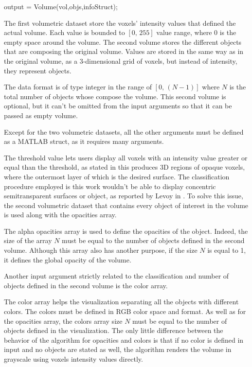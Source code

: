 \documentclass[12pt,a4paper]{extarticle}
\newcommand{\linespace}{\vspace{0pt}}
\begin{document}
\begin{cpp}[caption={Volume rendering MEX function call with left and right arguments, respectively output and input arguments},label=code:volumecall]
output = Volume(vol,objs,infoStruct);
\end{cpp}

The first volumetric dataset store the voxels' intensity values that defined the actual volume. Each value is bounded to $[0,\,255]$ value range, where $0$ is the empty space around the volume. The second volume stores the different objects that are composing the original volume. Values are stored in the same way as in the original volume, as a 3-dimensional grid of voxels, but instead of intensity, they represent objects. 

The data format is of type integer in the range of $[0,\,(N-1)]$ where $N$ is the total number of objects whose compose the volume. This second volume is optional, but it can't be omitted from the input arguments so that it can be passed as empty volume.

Except for the two volumetric datasets, all the other arguments must be defined as a MATLAB struct, as it requires many arguments.
\linespace

The threshold value lets users display all voxels with an intensity value greater or equal than the threshold, as stated in \cite{levoy_1988:4} this produces 3D regions of opaque voxels, where the outermost layer of which is the desired surface.
The classification procedure employed is this work wouldn't be able to display concentric semitransparent surfaces or object, as reported by Levoy in \cite{levoy_1988:4}. To solve this issue, the second volumetric dataset that contains every object of interest in the volume is used along with the opacities array.
\linespace

The alpha opacities array is used to define the opacities of the object. Indeed, the size of the array $N$ must be equal to the number of objects defined in the second volume. 
Although this array also has another purpose, if the size $N$ is equal to 1, it defines the global opacity of the volume.

Another input argument strictly related to the classification and number of objects defined in the second volume is the color array.
\linespace

The color array helps the visualization separating all the objects with different colors. The colors must be defined in RGB color space and format.
As well as for the opacities array, the colors array size $N$ must be equal to the number of objects defined in the visualization. The only little difference between the behavior of the algorithm for opacities and colors is that if no color is defined in input and no objects are stated as well, the algorithm renders the volume in grayscale using voxels intensity values directly. 
\linespace
\end{document}
